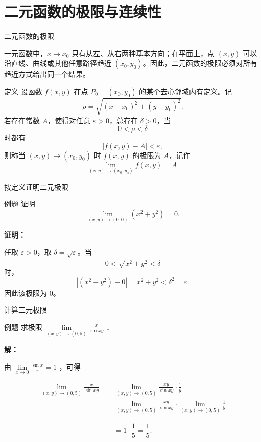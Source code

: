\documentclass[aspectratio=169,10pt]{ctexbeamer}
\begin{document}
\section{二元函数的极限与连续性}

\begin{frame}{二元函数的极限}
	\small
	
	一元函数中，\(x\to x_0\) 只有从左、从右两种基本方向；在平面上，点 \((x,y)\) 可以沿直线、曲线或其他任意路径趋近 \((x_0,y_0)\)。因此，二元函数的极限必须对所有趋近方式给出同一个结果。
	
	\begin{block}{定义}
		设函数 \(f(x,y)\) 在点 \(P_0=(x_0,y_0)\) 的某个去心邻域内有定义。记
		\[
		\rho=\sqrt{(x-x_0)^2+(y-y_0)^2}.
		\]
		若存在常数 \(A\)，使得对任意 \(\varepsilon>0\)，总存在 \(\delta>0\)，当
		\[
		0<\rho<\delta
		\]
		时都有
		\[
		|f(x,y)-A|<\varepsilon,
		\]
		则称当 \((x,y)\to(x_0,y_0)\) 时 \(f(x,y)\) 的极限为 \(A\)，记作
		\[
		\lim\limits_{(x,y)\to(x_0,y_0)}f(x,y)=A.
		\]
	\end{block}
	
\end{frame}

\begin{frame}{按定义证明二元极限}
	\begin{block}{例题}
		证明
		\[
		\lim\limits_{(x,y)\to(0,0)}(x^2+y^2)=0.
		\]
	\end{block}
	
	\pause
	
	\vspace{0.5cm}
	
	\textbf{证明：}
	
	任取 \(\varepsilon>0\)，取 \(\delta=\sqrt{\varepsilon}\)。当
	\[
	0<\sqrt{x^2+y^2}<\delta
	\]
	时，
	\[
	|(x^2+y^2)-0|=x^2+y^2<\delta^2=\varepsilon.
	\]
	因此该极限为 \(0\)。
\end{frame}


\begin{frame}{计算二元极限}
	\begin{block}{例题}
	求极限 $\lim\limits _{(x, y) \rightarrow(0,5)} \frac{x}{\sin x y}$ ．
	\end{block}
	
	\pause
	
	\vspace{0.5cm}
	
	\textbf{解：}
	
	由 $\lim\limits _{x \rightarrow 0} \frac{\sin x}{x}=1$ ，可得
	
	$$
	\begin{aligned}
		\lim\limits _{(x, y) \rightarrow(0,5)} \frac{x}{\sin x y} & =\lim\limits _{(x, y) \rightarrow(0,5)} \frac{x y}{\sin x y} \cdot \frac{1}{y} \\
		& =\lim\limits _{(x, y) \rightarrow(0,5)} \frac{x y}{\sin x y} \cdot \lim\limits _{(x, y) \rightarrow(0,5)} \frac{1}{y}
	\end{aligned}
	$$
	
	$$
	=1 \cdot \frac{1}{5}=\frac{1}{5} .
	$$
\end{frame}
\end{document}
